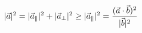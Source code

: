 \documentclass[preview]{standalone}
\begin{document}
\begin{align*}
\special{dvisvgm:raw <g id='unique000'>}|\vec a|^2=|\vec a_\parallel|^2+|\vec a_\perp|^2\ge|\vec a_\parallel|^2=\dfrac{(\vec a\cdot\vec b)^2}{|\vec b|^2}\special{dvisvgm:raw </g>}
\end{align*}
\end{document}
